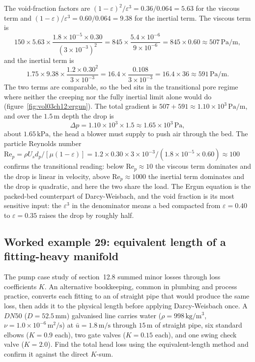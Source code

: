 The void-fraction factors are $(1-\varepsilon)^2/\varepsilon^3 = 0.36/
0.064 = 5.63$ for the viscous term and $(1-\varepsilon)/\varepsilon^3 =
0.60/0.064 = 9.38$ for the inertial term. The viscous term is
\[
150\times5.63\times\frac{1.8\times10^{-5}\times0.30}{(3\times10^{-3})^2}
= 845\times\frac{5.4\times10^{-6}}{9\times10^{-6}} = 845\times0.60
\approx 507\,\si{\pascal\per\meter},
\]
and the inertial term is
\[
1.75\times9.38\times\frac{1.2\times0.30^2}{3\times10^{-3}} = 16.4
\times\frac{0.108}{3\times10^{-3}} = 16.4\times36 \approx 591\,\si{
\pascal\per\meter}.
\]
The two terms are comparable, so the bed sits in the transitional pore
regime where neither the creeping nor the fully inertial limit alone
would do (figure~\ref{fig:vol03ch12:ergun}). The total gradient is $507 + 591 \approx 1.10\times10^{3}\,
\si{\pascal\per\meter}$, and over the $1.5\,\si{\meter}$ depth the drop
is
\[
\Delta p = 1.10\times10^{3}\times1.5 \approx 1.65\times10^{3}\,\si{
\pascal},
\]
about $1.65\,\text{kPa}$, the head a blower must supply to push air
through the bed. The particle Reynolds number $\text{Re}_p = \rho U_s
d_p/[\mu(1-\varepsilon)] = 1.2\times0.30\times3\times10^{-3}/(1.8\times
10^{-5}\times0.60) \approx 100$ confirms the transitional reading:
below $\text{Re}_p\approx10$ the viscous term dominates and the drop is
linear in velocity, above $\text{Re}_p\approx1000$ the inertial term
dominates and the drop is quadratic, and here the two share the load.
The Ergun equation is the packed-bed counterpart of Darcy-Weisbach,
and the void fraction is its most sensitive input: the $\varepsilon^3$
in the denominator means a bed compacted from $\varepsilon = 0.40$ to
$\varepsilon = 0.35$ raises the drop by roughly half.



\subsection*{Worked example 29: equivalent length of a fitting-heavy manifold}

The pump case study of section~12.8 summed minor losses through
loss coefficients $K$. An alternative bookkeeping, common in plumbing
and process practice, converts each fitting to an  of straight pipe that would produce the same loss, then adds it
to the physical length before applying Darcy-Weisbach once. A
$DN50$ ($D = 52.5\,\si{\milli\meter}$) galvanised line carries water
($\rho = 998\,\si{\kilogram\per\meter\cubed}$, $\nu = 1.0\times10^{-6}
\,\si{\meter}^2/\si{\second}$) at $\bar u = 1.8\,\si{\meter\per\second}$
through $15\,\si{\meter}$ of straight pipe, six standard elbows
($K = 0.9$ each), two gate valves ($K = 0.15$ each), and one swing
check valve ($K = 2.0$). Find the total head loss using the
equivalent-length method and confirm it against the direct $K$-sum.

